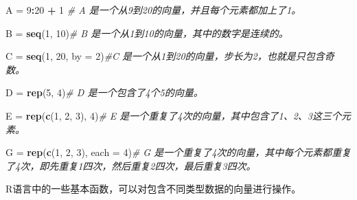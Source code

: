 \documentclass[]{book}
\newenvironment{Shaded}{\begin{snugshade}}{\end{snugshade}}
\newcommand{\CommentTok}[1]{\textcolor[rgb]{0.56,0.35,0.01}{\textit{#1}}}
\newcommand{\DataTypeTok}[1]{\textcolor[rgb]{0.13,0.29,0.53}{#1}}
\newcommand{\DecValTok}[1]{\textcolor[rgb]{0.00,0.00,0.81}{#1}}
\newcommand{\KeywordTok}[1]{\textcolor[rgb]{0.13,0.29,0.53}{\textbf{#1}}}
\newcommand{\NormalTok}[1]{#1}
\newcommand{\OperatorTok}[1]{\textcolor[rgb]{0.81,0.36,0.00}{\textbf{#1}}}
\newcommand{\StringTok}[1]{\textcolor[rgb]{0.31,0.60,0.02}{#1}}
\begin{document}
\begin{Shaded}
\begin{Highlighting}[]
\NormalTok{A =}\StringTok{ }\DecValTok{9}\OperatorTok{:}\DecValTok{20} \OperatorTok{+}\StringTok{ }\DecValTok{1} \CommentTok{# A 是一个从9到20的向量，并且每个元素都加上了1。}

\NormalTok{B =}\StringTok{ }\KeywordTok{seq}\NormalTok{(}\DecValTok{1}\NormalTok{, }\DecValTok{10}\NormalTok{)}\CommentTok{# B 是一个从1到10的向量，其中的数字是连续的。}

\NormalTok{C =}\StringTok{ }\KeywordTok{seq}\NormalTok{(}\DecValTok{1}\NormalTok{, }\DecValTok{20}\NormalTok{, }\DataTypeTok{by =} \DecValTok{2}\NormalTok{)}\CommentTok{#C 是一个从1到20的向量，步长为2，也就是只包含奇数。}

\NormalTok{D =}\StringTok{ }\KeywordTok{rep}\NormalTok{(}\DecValTok{5}\NormalTok{, }\DecValTok{4}\NormalTok{)}\CommentTok{# D 是一个包含了4个5的向量。}

\NormalTok{E =}\StringTok{ }\KeywordTok{rep}\NormalTok{(}\KeywordTok{c}\NormalTok{(}\DecValTok{1}\NormalTok{, }\DecValTok{2}\NormalTok{, }\DecValTok{3}\NormalTok{), }\DecValTok{4}\NormalTok{)}\CommentTok{# E 是一个重复了4次的向量，其中包含了1、2、3这三个元素。}

\NormalTok{G =}\StringTok{ }\KeywordTok{rep}\NormalTok{(}\KeywordTok{c}\NormalTok{(}\DecValTok{1}\NormalTok{, }\DecValTok{2}\NormalTok{, }\DecValTok{3}\NormalTok{), }\DataTypeTok{each =} \DecValTok{4}\NormalTok{)}\CommentTok{# G 是一个重复了4次的向量，其中每个元素都重复了4次，即先重复1四次，然后重复2四次，最后重复3四次。}
\end{Highlighting}
\end{Shaded}

R语言中的一些基本函数，可以对包含不同类型数据的向量进行操作。
\end{document}
